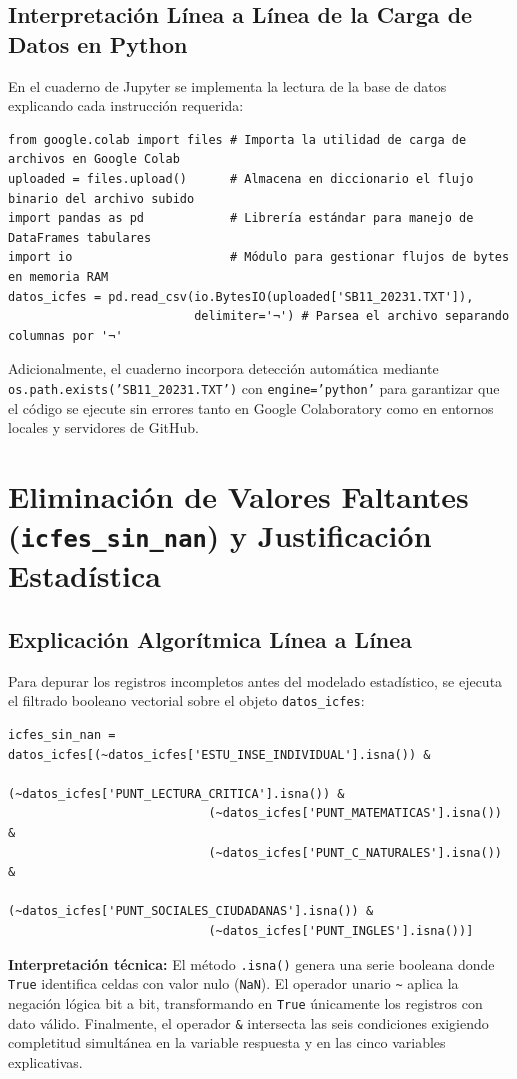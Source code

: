\documentclass[11pt,letterpaper]{article}
\begin{document}
\subsection{Interpretación Línea a Línea de la Carga de Datos en Python}
En el cuaderno de Jupyter se implementa la lectura de la base de datos explicando cada instrucción requerida:
\begin{verbatim}
from google.colab import files # Importa la utilidad de carga de archivos en Google Colab
uploaded = files.upload()      # Almacena en diccionario el flujo binario del archivo subido
import pandas as pd            # Librería estándar para manejo de DataFrames tabulares
import io                      # Módulo para gestionar flujos de bytes en memoria RAM
datos_icfes = pd.read_csv(io.BytesIO(uploaded['SB11_20231.TXT']),
                          delimiter='¬') # Parsea el archivo separando columnas por '¬'
\end{verbatim}
Adicionalmente, el cuaderno incorpora detección automática mediante \texttt{os.path.exists('SB11\_20231.TXT')} con \texttt{engine='python'} para garantizar que el código se ejecute sin errores tanto en Google Colaboratory como en entornos locales y servidores de GitHub.

\section{Eliminación de Valores Faltantes (\texttt{icfes\_sin\_nan}) y Justificación Estadística}

\subsection{Explicación Algorítmica Línea a Línea}
Para depurar los registros incompletos antes del modelado estadístico, se ejecuta el filtrado booleano vectorial sobre el objeto \texttt{datos\_icfes}:
\begin{verbatim}
icfes_sin_nan = datos_icfes[(~datos_icfes['ESTU_INSE_INDIVIDUAL'].isna()) &
                            (~datos_icfes['PUNT_LECTURA_CRITICA'].isna()) &
                            (~datos_icfes['PUNT_MATEMATICAS'].isna()) &
                            (~datos_icfes['PUNT_C_NATURALES'].isna()) &
                            (~datos_icfes['PUNT_SOCIALES_CIUDADANAS'].isna()) &
                            (~datos_icfes['PUNT_INGLES'].isna())]
\end{verbatim}
\textbf{Interpretación técnica:} El método \texttt{.isna()} genera una serie booleana donde \texttt{True} identifica celdas con valor nulo (\texttt{NaN}). El operador unario \texttt{\~{}} aplica la negación lógica bit a bit, transformando en \texttt{True} únicamente los registros con dato válido. Finalmente, el operador \texttt{\&} intersecta las seis condiciones exigiendo completitud simultánea en la variable respuesta y en las cinco variables explicativas.
\end{document}
